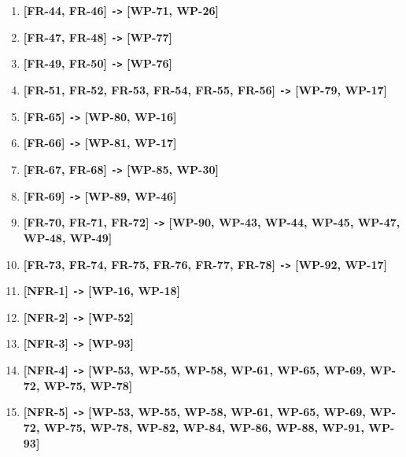\documentclass[a4paper, 12pt, oneside]{book}
\begin{document}
\begin{enumerate}[label = -]
	\item \textbf{[FR-44, FR-46] \texttt{->} [WP-71, WP-26]}
	\item \textbf{[FR-47, FR-48] \texttt{->} [WP-77]}
	\item \textbf{[FR-49, FR-50] \texttt{->} [WP-76]}
	\item \textbf{[FR-51, FR-52, FR-53, FR-54, FR-55, FR-56] \texttt{->} [WP-79, WP-17]}
	\item \textbf{[FR-65] \texttt{->} [WP-80, WP-16]}
	\item \textbf{[FR-66] \texttt{->} [WP-81, WP-17]}
	\item \textbf{[FR-67, FR-68] \texttt{->} [WP-85, WP-30]}
	\item \textbf{[FR-69] \texttt{->} [WP-89, WP-46]}
	\item \textbf{[FR-70, FR-71, FR-72] \texttt{->} [WP-90, WP-43, WP-44, WP-45, WP-47, WP-48, WP-49]}
	\item \textbf{[FR-73, FR-74, FR-75, FR-76, FR-77, FR-78] \texttt{->} [WP-92, WP-17]}
	\item \textbf{[NFR-1] \texttt{->} [WP-16, WP-18]}
	\item \textbf{[NFR-2] \texttt{->} [WP-52]}
	\item \textbf{[NFR-3] \texttt{->} [WP-93]}
	\item \textbf{[NFR-4] \texttt{->} [WP-53, WP-55, WP-58, WP-61, WP-65, WP-69, WP-72, WP-75, WP-78]}
	\item \textbf{[NFR-5] \texttt{->} [WP-53, WP-55, WP-58, WP-61, WP-65, WP-69, WP-72, WP-75, WP-78, WP-82, WP-84, WP-86, WP-88, WP-91, WP-93]}
\end{enumerate}
\end{document}
